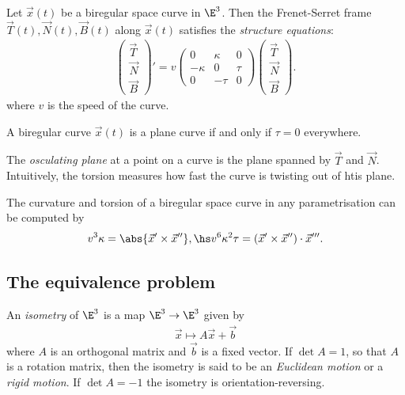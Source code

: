 \documentclass{article}
\begin{document}
\begin{theorem}
	Let $\vec x(t)$ be a biregular space curve in $\E^3$. Then the Frenet-Serret
	frame $\vec T(t), \vec N(t), \vec B(t)$ along $\vec x(t)$ satisfies the
	\emph{structure equations}:
	\begin{align*}
		\begin{pmatrix}
			\vec T \\
			\vec N \\
			\vec B
		\end{pmatrix}'
		= v\begin{pmatrix}
			   0       & \kappa & 0    \\
			   -\kappa & 0      & \tau \\
			   0       & -\tau  & 0
		   \end{pmatrix}
		\begin{pmatrix}
			\vec T \\
			\vec N \\
			\vec B
		\end{pmatrix}.
	\end{align*}
	where $v$ is the speed of the curve.
\end{theorem}

\begin{theorem}
	A biregular curve $\vec x(t)$ is a plane curve if and only if $\tau=0$ everywhere.
\end{theorem}

\begin{definition}
	The \emph{osculating plane} at a point on a curve is the plane spanned by $\vec T$ and
	$\vec N$. Intuitively, the torsion measures how fast the curve is twisting out of htis plane.
\end{definition}

\begin{theorem}
	The curvature and torsion of a biregular space curve in any parametrisation can be
	computed by
	\begin{align*}
		v^3\kappa = \abs{\vec x' \times \vec x''},\hs
		v^6\kappa^2\tau = (\vec x' \times \vec x'') \cdot \vec x'''.
	\end{align*}
\end{theorem}

\subsection{The equivalence problem}

\begin{definition}
	An \emph{isometry} of $\E^3$ is a map $\E^3\to\E^3$ given by
	\begin{align*}
		\vec x \mapsto A\vec x + \vec b
	\end{align*}
	where $A$ is an orthogonal matrix and $\vec b$ is a fixed vector. If $\det A = 1$,
	so that $A$ is a rotation matrix, then the isometry is said to be an \emph{Euclidean motion}
	or a \emph{rigid motion}. If $\det A = -1$ the isometry is orientation-reversing.
\end{definition}
\end{document}
